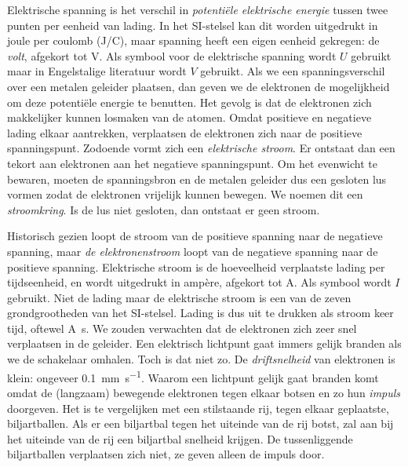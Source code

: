Elektrische spanning is het verschil in \textsl{potentiële elektrische energie} tussen twee punten per eenheid van lading. In het SI-stelsel kan dit worden uitgedrukt in joule per coulomb (\si[per-mode=symbol]{\joule\per\coulomb}), maar spanning heeft een eigen eenheid gekregen: de \textsl{volt}, afgekort tot \si{\volt}. Als symbool voor de elektrische spanning wordt $U$ gebruikt maar in Engelstalige literatuur wordt $V$ gebruikt. Als we een spanningsverschil over een metalen geleider plaatsen, dan geven we de elektronen de mogelijkheid om deze potentiële energie te benutten. Het gevolg is dat de elektronen zich makkelijker kunnen losmaken van de atomen. Omdat positieve en negatieve lading elkaar aantrekken, verplaatsen de elektronen zich naar de positieve spanningspunt. Zodoende vormt zich een \textsl{elektrische stroom}. Er ontstaat dan een tekort aan elektronen aan het negatieve spanningspunt. Om het evenwicht te bewaren, moeten de spanningsbron en de metalen geleider dus een gesloten lus vormen zodat de elektronen vrijelijk kunnen bewegen. We noemen dit een \textsl{stroomkring}. Is de lus niet gesloten, dan ontstaat er geen stroom.

Historisch gezien loopt de stroom van de positieve spanning naar de negatieve spanning, maar \textsl{de elektronenstroom} loopt van de negatieve spanning naar de positieve spanning. Elektrische stroom is de hoeveelheid verplaatste lading per tijdseenheid, en wordt uitgedrukt in ampère, afgekort tot \si{\ampere}. Als symbool wordt $I$ gebruikt. Niet de lading maar de elektrische stroom is een van de zeven grondgrootheden van het SI-stelsel. Lading is dus uit te drukken als stroom keer tijd, oftewel \si{\ampere\second}. We zouden verwachten dat de elektronen zich zeer snel verplaatsen in de geleider. Een elektrisch lichtpunt gaat immers gelijk branden als we de schakelaar omhalen. Toch is dat niet zo. De \textsl{driftsnelheid} van elektronen is klein: ongeveer \SI[per-mode=symbol]{0,1}{\milli\meter\per\second}. Waarom een lichtpunt gelijk gaat branden komt omdat de (langzaam) bewegende elektronen tegen elkaar botsen en zo hun \textsl{impuls} doorgeven. Het is te vergelijken met een stilstaande rij, tegen elkaar geplaatste, biljartballen. Als er een biljartbal tegen het uiteinde van de rij botst, zal aan bij het uiteinde van de rij een biljartbal snelheid krijgen. De tussenliggende biljartballen verplaatsen zich niet, ze geven alleen de impuls door. 









